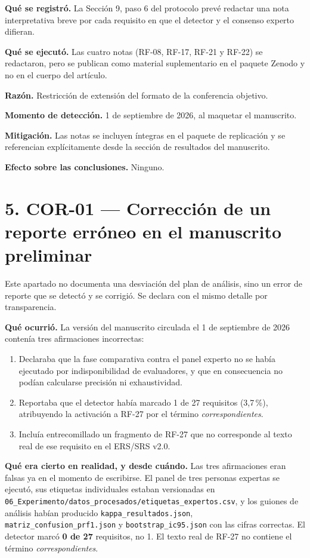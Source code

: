 \documentclass[11pt,a4paper]{article}
\begin{document}
\textbf{Qué se registró.} La Sección 9, paso 6 del protocolo prevé redactar una
nota interpretativa breve por cada requisito en que el detector y el consenso
experto difieran.

\textbf{Qué se ejecutó.} Las cuatro notas (RF-08, RF-17, RF-21 y RF-22) se
redactaron, pero se publican como material suplementario en el paquete Zenodo y
no en el cuerpo del artículo.

\textbf{Razón.} Restricción de extensión del formato de la conferencia
objetivo.

\textbf{Momento de detección.} 1 de septiembre de 2026, al maquetar el
manuscrito.

\textbf{Mitigación.} Las notas se incluyen íntegras en el paquete de
replicación y se referencian explícitamente desde la sección de resultados del
manuscrito.

\textbf{Efecto sobre las conclusiones.} Ninguno.

\section*{5. COR-01 --- Corrección de un reporte erróneo en el manuscrito
preliminar}

Este apartado no documenta una desviación del plan de análisis, sino un error
de reporte que se detectó y se corrigió. Se declara con el mismo detalle por
transparencia.

\textbf{Qué ocurrió.} La versión del manuscrito circulada el 1 de septiembre de
2026 contenía tres afirmaciones incorrectas:

\begin{enumerate}
\item Declaraba que la fase comparativa contra el panel experto no se había
      ejecutado por indisponibilidad de evaluadores, y que en consecuencia no
      podían calcularse precisión ni exhaustividad.
\item Reportaba que el detector había marcado 1 de 27 requisitos (3,7\,\%),
      atribuyendo la activación a RF-27 por el término
      \textit{correspondientes}.
\item Incluía entrecomillado un fragmento de RF-27 que no corresponde al texto
      real de ese requisito en el ERS/SRS v2.0.
\end{enumerate}

\textbf{Qué era cierto en realidad, y desde cuándo.} Las tres afirmaciones eran
falsas ya en el momento de escribirse. El panel de tres personas expertas se
ejecutó, sus etiquetas individuales estaban versionadas en
\texttt{06\_Experimento/datos\_procesados/etiquetas\_expertos.csv}, y los
guiones de análisis habían producido \texttt{kappa\_resultados.json},
\texttt{matriz\_confusion\_prf1.json} y \texttt{bootstrap\_ic95.json} con las
cifras correctas. El detector marcó \textbf{0 de 27} requisitos, no 1. El texto
real de RF-27 no contiene el término \textit{correspondientes}.
\end{document}
